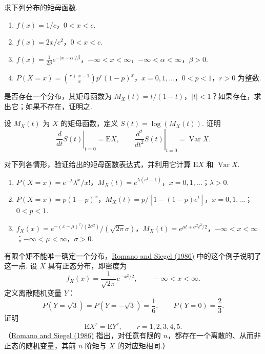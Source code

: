 \begin{exercise}\label{exercise:2.30}
求下列分布的矩母函数.
\begin{enumerate}
\item[(a)] $f(x)=1/c$，$0<x<c$.
\item[(b)] $f(x)=2x/c^2$，$0<x<c$.
\item[(c)] $f(x)=\frac1{2\beta}e^{-|x-\alpha|/\beta}$，$-\infty<x<\infty$，$-\infty<\alpha<\infty$，$\beta>0$.
\item[(d)] $P(X=x)=\binom{r+x-1}x p^r(1-p)^x$，$x=0,1,\ldots$，$0<p<1$，$r>0$ 为整数.
\end{enumerate}
\end{exercise}
\begin{exercise}\label{exercise:2.31}
是否存在一个分布，其矩母函数为 $M_X(t)=t/(1-t)$，$|t|<1$？如果存在，求出它；如果不存在，证明之.
\end{exercise}
\begin{exercise}\label{exercise:2.32}
设 $M_X(t)$ 为 $X$ 的矩母函数，定义 $S(t)=\log(M_X(t))$. 证明
$$\left.\frac d{dt}S(t)\right|_{t=0}=\mathrm EX,\qquad
\left.\frac{d^2}{dt^2}S(t)\right|_{t=0}=\operatorname{Var}X.$$
\end{exercise}
\begin{exercise}\label{exercise:2.33}
对下列各情形，验证给出的矩母函数表达式，并利用它计算 $\mathrm EX$ 和 $\operatorname{Var}X$.
\begin{enumerate}
\item[(a)] $P(X=x)=e^{-\lambda}\lambda^x/x!$，$M_X(t)=e^{\lambda(e^t-1)}$，$x=0,1,\ldots$；$\lambda>0$.
\item[(b)] $P(X=x)=p(1-p)^x$，$M_X(t)=p/[1-(1-p)e^t]$，$x=0,1,\ldots$；$0<p<1$.
\item[(c)] $f_X(x)=e^{-(x-\mu)^2/(2\sigma^2)}/(\sqrt{2\pi}\sigma)$，$M_X(t)=e^{\mu t+\sigma^2t^2/2}$，$-\infty<x<\infty$；$-\infty<\mu<\infty$，$\sigma>0$.
\end{enumerate}
\end{exercise}
\begin{exercise}\label{exercise:2.34}
有限个矩不能唯一确定一个分布，\hyperref[bib:source258]{Romano and Siegel (1986)} 中的这个例子说明了这一点. 设 $X$ 具有正态分布，即密度为
$$f_X(x)=\frac1{\sqrt{2\pi}}e^{-x^2/2},\qquad-\infty<x<\infty.$$
定义离散随机变量 $Y$：
$$P(Y=\sqrt3)=P(Y=-\sqrt3)=\frac16,\qquad P(Y=0)=\frac23.$$
证明
$$\mathrm EX^r=\mathrm EY^r,\qquad r=1,2,3,4,5.$$
（\hyperref[bib:source258]{Romano and Siegel (1986)} 指出，对任意有限的 $n$，都存在一个离散的、从而非正态的随机变量，其前 $n$ 阶矩与 $X$ 的对应矩相同.）
\end{exercise}
